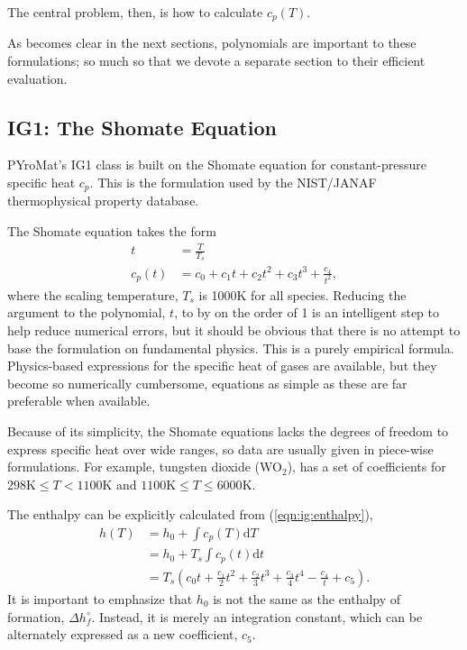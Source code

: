 \documentclass[letterpaper,11pt]{article}
\newcommand{\PM}{PYroMat}
\def\d{\mathrm{d}}
\begin{document}
The central problem, then, is how to calculate $c_p(T)$.

As becomes clear in the next sections, polynomials are important to these formulations; so much so that we devote a separate section to their efficient evaluation.

\subsection{IG1: The Shomate Equation}

\PM's IG1 class is built on the Shomate equation for constant-pressure specific heat $c_p$.  This is the formulation used by the NIST/JANAF thermophysical property database.

The Shomate equation takes the form
\begin{align}
t &= \frac{T}{T_s}\\
c_p(t) &= c_0 + c_1 t + c_2 t^2 + c_3 t^3 + \frac{c_4}{t^2},
\end{align}
where the scaling temperature, $T_s$ is 1000K for all species.  Reducing the argument to the polynomial, $t$, to by on the order of 1 is an intelligent step to help reduce numerical errors, but it should be obvious that there is no attempt to base the formulation on fundamental physics.  This is a purely empirical formula.  Physics-based expressions for the specific heat of gases are available, but they become so numerically cumbersome, equations as simple as these are far preferable when available.

Because of its simplicity, the Shomate equations lacks the degrees of freedom to express specific heat over wide ranges, so data are usually given in piece-wise formulations.  For example, tungsten dioxide (WO$_2$), has a set of coefficients for $298\mathrm{K} \le T < 1100\mathrm{K}$ and $1100\mathrm{K} \le T \le 6000\mathrm{K}$.

The enthalpy can be explicitly calculated from (\ref{eqn:ig:enthalpy}),
\begin{align}
h(T) &= h_0 + \int c_p(T) \d T \nonumber\\
 &= h_0 + T_s \int c_p(t) \d t \nonumber\\
 &= T_s \left(c_0 t + \frac{c_1}{2} t^2 + \frac{c_2}{3} t^3 + \frac{c_3}{4} t^4 - \frac{c_4}{t} + c_5 \right).
\end{align}
It is important to emphasize that $h_0$ is not the same as the enthalpy of formation, $\Delta h^\circ_f$.  Instead, it is merely an integration constant, which can be alternately expressed as a new coefficient, $c_5$.
\end{document}
